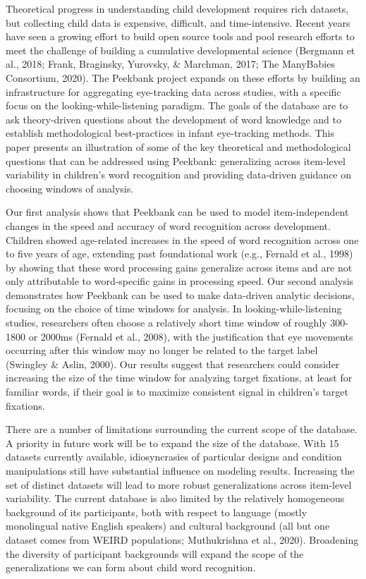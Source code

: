 \documentclass[10pt, letterpaper]{article}
\begin{document}
Theoretical progress in understanding child development requires rich
datasets, but collecting child data is expensive, difficult, and
time-intensive. Recent years have seen a growing effort to build open
source tools and pool research efforts to meet the challenge of building
a cumulative developmental science (Bergmann et al., 2018; Frank,
Braginsky, Yurovsky, \& Marchman, 2017; The ManyBabies Consortium,
2020). The Peekbank project expands on these efforts by building an
infrastructure for aggregating eye-tracking data across studies, with a
specific focus on the looking-while-listening paradigm. The goals of the
database are to ask theory-driven questions about the development of
word knowledge and to establish methodological best-practices in infant
eye-tracking methods. This paper presents an illustration of some of the
key theoretical and methodological questions that can be addressed using
Peekbank: generalizing across item-level variability in children's word
recognition and providing data-driven guidance on choosing windows of
analysis.

Our first analysis shows that Peekbank can be used to model
item-independent changes in the speed and accuracy of word recognition
across development. Children showed age-related increases in the speed
of word recognition across one to five years of age, extending past
foundational work (e.g., Fernald et al., 1998) by showing that these
word processing gains generalize across items and are not only
attributable to word-specific gains in processing speed. Our second
analysis demonstrates how Peekbank can be used to make data-driven
analytic decisions, focusing on the choice of time windows for analysis.
In looking-while-listening studies, researchers often choose a
relatively short time window of roughly 300-1800 or 2000ms (Fernald et
al., 2008), with the justification that eye movements occurring after
this window may no longer be related to the target label (Swingley \&
Aslin, 2000). Our results suggest that researchers could consider
increasing the size of the time window for analyzing target fixations,
at least for familiar words, if their goal is to maximize consistent
signal in children's target fixations.

There are a number of limitations surrounding the current scope of the
database. A priority in future work will be to expand the size of the
database. With 15 datasets currently available, idiosyncrasies of
particular designs and condition manipulations still have substantial
influence on modeling results. Increasing the set of distinct datasets
will lead to more robust generalizations across item-level variability.
The current database is also limited by the relatively homogeneous
background of its participants, both with respect to language (mostly
monolingual native English speakers) and cultural background (all but
one dataset comes from WEIRD populations; Muthukrishna et al., 2020).
Broadening the diversity of participant backgrounds will expand the
scope of the generalizations we can form about child word recognition.
\end{document}
